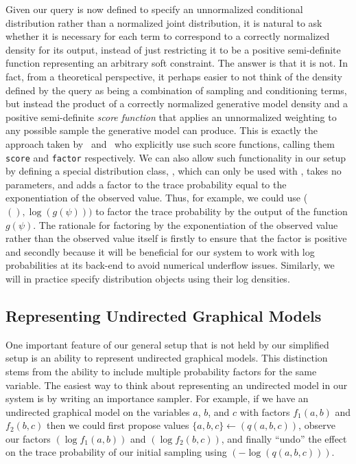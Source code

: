 Given our query is now defined to specify an unnormalized conditional distribution rather than a normalized
joint distribution, it is natural to ask whether it is necessary for each \observe term to correspond to
a correctly normalized density for its output, instead of just restricting it to be a positive semi-definite
function representing an arbitrary soft constraint.  The answer is that it is not.  In fact, from a theoretical perspective,
it perhaps easier to not think of the density defined by the query as being a combination of sampling and conditioning terms,
but instead the product of a correctly normalized generative
model density and a positive semi-definite \emph{score function} that applies an unnormalized weighting to any possible
sample the generative model can produce.  This is
exactly the approach taken by~\citep{staton2016semantics} and~\citep{goodman_book_2014} who explicitly use such
score functions, calling them {\small \texttt{score}} and {\small \texttt{factor}} respectively.
We can also allow such functionality in our setup by defining a
special distribution class, \boppfactor, which can only be used with \observe, takes no parameters, and 
adds a factor to the trace probability equal to the exponentiation of the observed value.  Thus, for example, we could use
\observe (\boppfactor$(),\log(g(\psi)))$ to factor the trace probability by the output of the function $g(\psi)$.
The rationale for factoring by the exponentiation of the observed value rather than the observed value itself
is firstly to ensure that the factor is positive and secondly because it will be beneficial for
our system to work with log probabilities at its back-end to avoid numerical underflow issues.  Similarly,
we will in practice specify distribution objects using their log densities.

\subsection{Representing Undirected Graphical Models}
\label{sec:probprog:models:undirected}

One important feature of our general setup that is not held by our simplified setup
is an ability to represent undirected graphical models.  This distinction stems from the
ability to include multiple probability
factors for the same variable.  The easiest way to think
about representing an undirected model in our system is by writing an importance sampler.  For example, if
we have an undirected graphical model on the variables $a$, $b$, and $c$ with factors $f_1(a,b)$ and $f_2(b,c)$
then we could first propose values $\{a,b,c\}\leftarrow $\sample$(q(a,b,c))$, observe our factors \observe$(\log f_1(a,b))$
and \observe$(\log f_2(b,c))$, and finally ``undo'' the effect on the trace probability of our initial sampling using
\observe$(-\log(q(a,b,c)))$.